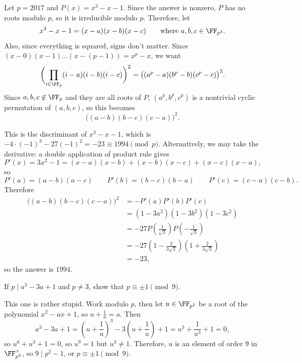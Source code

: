 \documentclass[11pt]{scrartcl}
\begin{document}
\begin{solution}{}
    Let $p = 2017$ and $P(x) = x^3 - x - 1$. Since the answer is nonzero, $P$ has no roots modulo $p$, so it is irreducible modulo $p$. Therefore, let
    \[x^3 - x - 1 = (x - a)(x - b)(x - c) \qquad \text{where $a,b,c \in \FF_{p^3}$.}\]
    Also, since everything is squared, signs don't matter. Since $(x - 0)(x - 1)\dots(x - (p - 1)) = x^p - x$, we want
    \[\biggl(\prod_{i \in \FF_p}(i - a)(i - b)(i - c)\biggr)^2 = \bigl((a^p - a)(b^p - b)(c^p - c)\bigr)^2.\]
    Since $a,b,c \not\in \FF_p$ and they are all roots of $P$, $(a^p,b^p,c^p)$ is a nontrivial cyclic permutation of $(a,b,c)$, so this becomes
    \[\bigl((a - b)(b - c)(c - a)\bigr)^2.\]

    This is the discriminant of $x^3 - x - 1$, which is $-4 \cdot (-1)^3 - 27(-1)^2 = -23 \equiv 1994 \pmod p$. Alternatively, we may take the derivative: a double application of product rule gives
    \[P'(x) = 3x^2 - 1 = (x - a)(x - b) + (x - b)(x - c) + (x - c)(x - a),\]
    so
    \[P'(a) = (a - b)(a - c) \qquad P'(b) = (b - c)(b - a) \qquad P'(c) = (c - a)(c - b).\]
    Therefore
    \begin{align*}
        \bigl((a - b)(b - c)(c - a)\bigr)^2 &= -P'(a)P'(b)P'(c) \\
        &= (1 - 3a^2)(1 - 3b^2)(1 - 3c^2) \\
        &= -27P\left(\frac1{\sqrt 3}\right)P\left(-\frac1{\sqrt 3}\right) \\
        &= -27\left(1 - \frac2{3\sqrt 3}\right)\left(1 + \frac2{3\sqrt 3}\right) \\
        &= -23,
    \end{align*}
    so the answer is $1994$.
\end{solution}

\begin{example}[Brazil 2017/6]\label{exa:brazil}
    If $p \mid a^3 - 3a + 1$ and $p \neq 3$, show that $p \equiv \pm 1 \pmod 9$.
\end{example}

\begin{solution}{}
    This one is rather stupid. Work modulo $p$, then let $u \in \FF_{p^2}$ be a root of the polynomial $x^2 - ax + 1$, so $u + \frac1u = a$. Then
    \[a^3 - 3a + 1 = \left(u + \frac1u\right)^3 - 3\left(u + \frac1u\right) + 1 = u^3 + \frac1{u^3} + 1 = 0,\]
    so $u^6 + u^3 + 1 = 0$, so $u^9 = 1$ but $u^3 \neq 1$. Therefore, $u$ is an element of order $9$ in $\FF_{p^2}^\times$, so $9 \mid p^2 - 1$, or $p \equiv \pm 1 \pmod 9$.
\end{solution}
\end{document}
